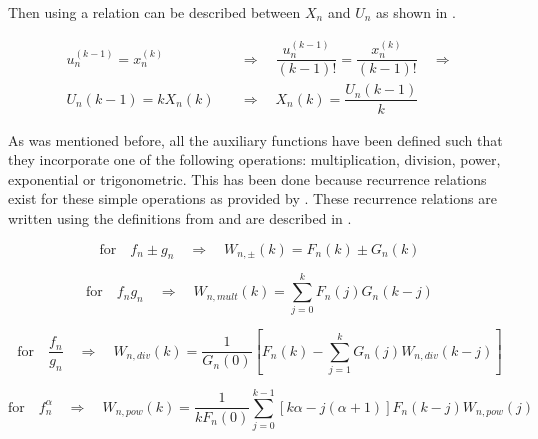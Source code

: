 Then using  a relation can be described between $X_{n}$ and $U_{n}$ as shown in  \citep{scott2008high}. 

\begin{equation} \label{eq:UnXn}
\begin{split}
u_{n}^{\left( k-1\right)}=x_{n}^{\left( k\right)} \quad &\Rightarrow \quad \dfrac{u_{n}^{\left( k-1\right)}}{\left(k-1\right)!} = \dfrac{x_{n}^{\left( k\right)}}{\left(k-1\right)!} \quad \Rightarrow\\
U_{n}\left(k-1\right)=kX_{n}\left(k\right) \quad &\Rightarrow \quad X_{n}\left(k\right)=\dfrac{U_{n}\left(k-1\right)}{k}
\end{split}
\end{equation}

As was mentioned before, all the auxiliary functions have been defined such that they incorporate one of the following operations: multiplication, division, power, exponential or trigonometric. This has been done because recurrence relations exist for these simple operations as provided by \cite{jorba2005software}. These recurrence relations are written using the definitions from  and are described in .

\begin{equation} \label{eq:recRel1}
\text{for} \quad f_{n} \pm g_{n} \quad \Rightarrow \quad W_{n,\pm}\left(k\right)= F_{n}\left(k\right) \pm G_{n}\left(k\right)
\end{equation}

\begin{equation} \label{eq:recRel2}
\text{for} \quad f_{n}g_{n} \quad \Rightarrow \quad W_{n,mult}\left(k\right)=\displaystyle\sum_{j=0}^{k}F_{n}\left(j\right)G_{n}\left(k-j\right)
\end{equation}

\begin{equation} \label{eq:recRel3}
\text{for} \quad \dfrac{f_{n}}{g_{n}} \quad \Rightarrow \quad W_{n,div}\left(k\right)= \dfrac{1}{G_{n}\left(0\right)}\left[F_{n}\left(k\right)-\displaystyle\sum_{j=1}^{k}G_{n}\left(j\right)W_{n,div}\left(k-j\right) \right]
\end{equation}

\begin{equation} \label{eq:recRel4}
\text{for} \quad f_{n}^{\alpha} \quad \Rightarrow \quad W_{n,pow}\left(k\right)= \dfrac{1}{kF_{n}\left(0\right)} \displaystyle\sum_{j=0}^{k-1}\left[k\alpha-j\left(\alpha+1\right)\right] F_{n}\left(k-j\right)W_{n,pow}\left(j\right) 
\end{equation}

